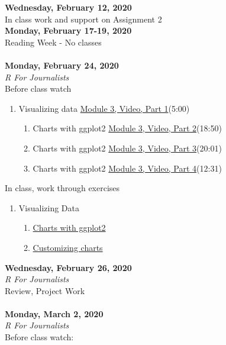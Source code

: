 \documentclass{article}
\begin{document}
\bigskip
\textbf{Wednesday, February 12, 2020\\
}
In class work and support on Assignment 2 \\
\textbf{Monday, February 17-19, 2020\\}
Reading Week - No classes\\\\
\textbf{Monday, February 24, 2020}\\
\emph{R For Journalists}\\
Before class watch
\begin{enumerate}
\item Visualizing data \href{https://youtu.be/8VW-APX_5a0}{Module 3, Video, Part 1}(5:00)
\begin{enumerate}
\item Charts with ggplot2 \href{https://youtu.be/ZBewoHKyMcc}{Module 3, Video, Part 2}(18:50)
\item Charts with ggplot2 \href{https://youtu.be/x4OMSY2kz8M}{Module 3, Video, Part 3}(20:01)
\item Charts with ggplot2 \href{https://youtu.be/xjnj-rJwd6A}{Module 3, Video, Part 4}(12:31)
\end{enumerate}
\end{enumerate}
\bigskip
In class, work through exercises 
\begin{enumerate}
\item Visualizing Data
\begin{enumerate}
\item \href{http://code.r-journalism.com/chapter-4/#section-ggplot2}{Charts with ggplot2}
\item \href{http://code.r-journalism.com/chapter-4/#section-customizing-charts}{Customizing charts}
\end{enumerate}
\end{enumerate}
\bigskip
\textbf{Wednesday, February 26, 2020}\\
\emph{R For Journalists}\\
Review, Project Work\\\\
\textbf{Monday, March 2, 2020\\}
\emph{R For Journalists}\\
Before class watch:
\end{document}
